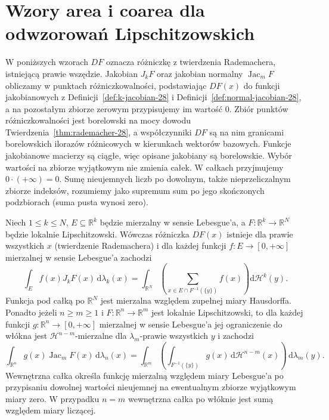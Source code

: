 \section{Wzory area i coarea dla odwzorowań Lipschitzowskich}
W poniższych wzorach $DF$ oznacza różniczkę z twierdzenia
Rademachera, istniejącą prawie wszędzie. Jakobian $J_kF$
oraz jakobian normalny $\operatorname{Jac}_mF$ obliczamy
w punktach różniczkowalności, podstawiając $DF(x)$
do funkcji jakobianowych z
Definicji~\ref{def:k-jacobian-28} i
Definicji~\ref{def:normal-jacobian-28},
a na pozostałym zbiorze zerowym przypisujemy im wartość $0$.
Zbiór punktów różniczkowalności jest borelowski
na mocy dowodu Twierdzenia~\ref{thm:rademacher-28},
a współczynniki $DF$ są na nim granicami borelowskich
ilorazów różnicowych w kierunkach wektorów bazowych.
Funkcje jakobianowe macierzy są ciągłe, więc opisane
jakobiany są borelowskie. Wybór wartości na zbiorze
wyjątkowym nie zmienia całek. W całkach przyjmujemy
$0\cdot(+\infty)=0$. Sumę nieujemnych liczb po
dowolnym, także nieprzeliczalnym zbiorze indeksów,
rozumiemy jako supremum sum po jego skończonych
podzbiorach (suma pusta wynosi zero).
\begin{twierdzenie}
\label{thm:lipschitz-area-coarea-28}
Niech $1\le k\le N$, $E\subseteq\mathbb R^k$ będzie
mierzalny w sensie Lebesgue'a, a $F:\mathbb R^k\to\mathbb R^N$
będzie lokalnie Lipschitzowski.
Wówczas różniczka $DF(x)$ istnieje dla prawie
wszystkich $x$ (twierdzenie Rademachera)
i dla każdej funkcji $f:E\to[0,+\infty]$
mierzalnej w sensie Lebesgue'a zachodzi
\[
 \int_E f(x)J_kF(x)\,\mathrm d\lambda_k(x)
 =\int_{\mathbb R^N}\left(\sum_{x\in E\cap F^{-1}(\{y\})}
 f(x)\right)\mathrm d\mathcal H^k(y).
\]
Funkcja pod całką po $\mathbb R^N$ jest mierzalna
względem zupełnej miary Hausdorffa.
Ponadto jeżeli $n\ge m\ge1$ i
$F:\mathbb R^n\to\mathbb R^m$ jest lokalnie
Lipschitzowski, to dla każdej funkcji
$g:\mathbb R^n\to[0,+\infty]$ mierzalnej
w sensie Lebesgue'a jej ograniczenie do włókna
jest $\mathcal H^{n-m}$-mierzalne dla
$\lambda_m$-prawie wszystkich $y$ i zachodzi
\[
 \int_{\mathbb R^n}g(x)\operatorname{Jac}_mF(x)
 \,\mathrm d\lambda_n(x)
 =\int_{\mathbb R^m}\left(
 \int_{F^{-1}(\{y\})}g(x)
 \,\mathrm d\mathcal H^{n-m}(x)\right)
 \,\mathrm d\lambda_m(y).
\]
Wewnętrzna całka określa funkcję mierzalną względem
miary Lebesgue'a po przypisaniu dowolnej wartości
nieujemnej na ewentualnym zbiorze wyjątkowym miary zero.
W przypadku $n=m$ wewnętrzna całka po włóknie
jest sumą względem miary liczącej.
\end{twierdzenie}

